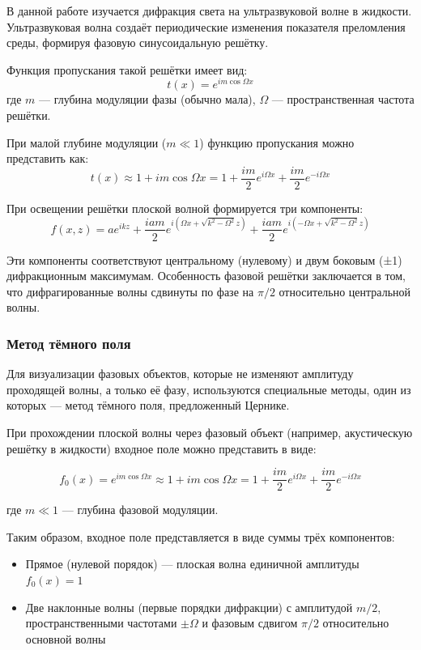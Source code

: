 В данной работе изучается дифракция света на ультразвуковой волне в жидкости. Ультразвуковая волна создаёт периодические изменения показателя преломления среды, формируя фазовую синусоидальную решётку.

Функция пропускания такой решётки имеет вид:
\begin{equation}
    t(x) = e^{im \cos \Omega x}
\end{equation}
где $m$ — глубина модуляции фазы (обычно мала), $\Omega$ — пространственная частота решётки.

При малой глубине модуляции ($m \ll 1$) функцию пропускания можно представить как:
\begin{equation}
    t(x) \approx 1 + im\cos\Omega x = 1 + \frac{im}{2}e^{i\Omega x} + \frac{im}{2}e^{-i\Omega x}
\end{equation}

При освещении решётки плоской волной формируется три компоненты:
\begin{equation}
    f(x,z) = ae^{ikz} + \frac{iam}{2}e^{i(\Omega x + \sqrt{k^2-\Omega^2}z)} + \frac{iam}{2}e^{i(-\Omega x + \sqrt{k^2-\Omega^2}z)}
\end{equation}

Эти компоненты соответствуют центральному (нулевому) и двум боковым (±1) дифракционным максимумам. Особенность фазовой решётки заключается в том, что дифрагированные волны сдвинуты по фазе на $\pi/2$ относительно центральной волны.

\subsubsection{Метод тёмного поля}

Для визуализации фазовых объектов, которые не изменяют амплитуду проходящей волны, а только её фазу, используются специальные методы, один из которых — метод тёмного поля, предложенный Цернике.

При прохождении плоской волны через фазовый объект (например, акустическую решётку в жидкости) входное поле можно представить в виде:

\begin{equation}
    f_0(x) = e^{im \cos \Omega x} \approx 1 + im \cos \Omega x = 1 + \frac{im}{2}e^{i\Omega x} + \frac{im}{2}e^{-i\Omega x}
\end{equation}

где $m \ll 1$ — глубина фазовой модуляции.

Таким образом, входное поле представляется в виде суммы трёх компонентов:
\begin{itemize}
    \item Прямое (нулевой порядок) — плоская волна единичной амплитуды $f_0(x) = 1$
    \item Две наклонные волны (первые порядки дифракции) с амплитудой $m/2$, пространственными частотами $\pm\Omega$ и фазовым сдвигом $\pi/2$ относительно основной волны
\end{itemize}

